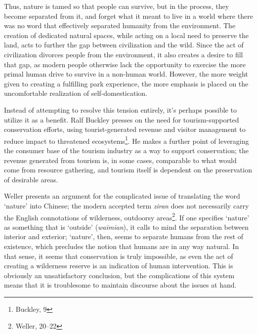 Thus, nature is tamed so that people can survive, but in the process, they
become separated from it, and forget what it meant to live in a world where
there was no word that effectively separated humanity from the environment.  The
creation of dedicated natural spaces, while acting on a local need to preserve
the land, acts to further the gap between civilization and the wild.  Since the
act of civilization divorces people from the environment, it also creates a
desire to fill that gap, as modern people otherwise lack the opportunity to
exercise the more primal human drive to survive in a non-human world. However,
the more weight given to creating a fulfilling park experience, the more
emphasis is placed on the uncomfortable realization of self-domestication.

Instead of attempting to resolve this tension entirely, it's perhaps possible to
utilize it as a benefit. Ralf Buckley presses on the need for tourism-supported
conservation efforts, using tourist-generated revenue and visitor management to
reduce impact to threatened ecosystems\footnote{Buckley, 9}. He makes a further
point of leveraging the consumer base of the tourism industry as a way to
support conservation; the revenue generated from tourism is, in some cases,
comparable to what would come from resource gathering, and tourism itself is
dependent on the preservation of desirable areas.

Weller presents an argument for the complicated issue of translating the word
`nature' into Chinese; the modern accepted term \textit{ziran} does not
necessarily carry the English connotations of wilderness, outdoorsy
areas\footnote{Weller, 20--22}. If one specifies `nature' as something that is
`outside' (\textit{waimian}), it calls to mind the separation between interior
and exterior; `nature', then, seems to separate humans from the rest of
existence, which precludes the notion that humans are in any way natural. In
that sense, it seems that conservation is truly impossible, as even the act of
creating a wilderness reserve is an indication of human intervention. This is
obviously an unsatisfactory conclusion, but the complications of this system
means that it is troublesome to maintain discourse about the issues at hand.
